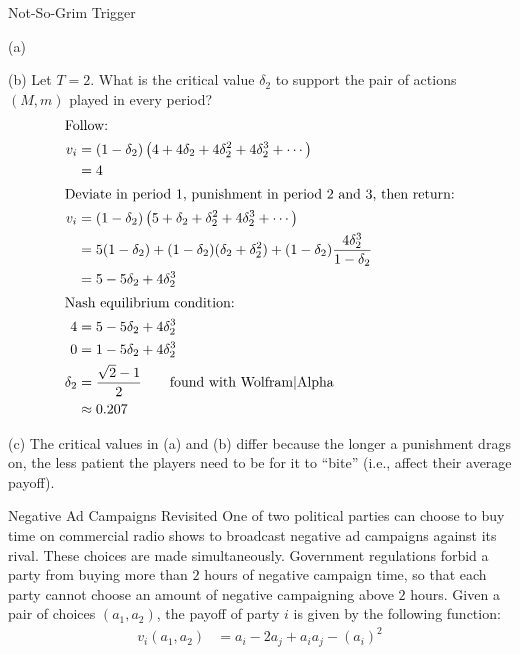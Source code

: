 \documentclass[8pt]{extarticle}
\begin{document}
\begin{problem}{Not-So-Grim Trigger}
\begin{problem}{(a)}
    \end{problem}
    \begin{problem}{(b)}
      Let $T = 2$. What is the critical value $\delta_2$ to support the pair of actions $(M,m)$ played in every period?
      \tcblower
      \begin{align*}
        \shortintertext{Follow:}
        v_i &= (1-\delta_2)\left(4 + 4\delta_2 + 4\delta_2^2 + 4\delta_2^3 + \cdots\right)\\
            &= 4\\
        \shortintertext{Deviate in period $1$, punishment in period $2$ and $3$, then return:}
        v_i &= (1-\delta_2)\left(5 + \delta_2 + \delta_2^2 + 4\delta_2^3 + \cdots\right) \\
            &= 5(1-\delta_2) + (1-\delta_2)(\delta_2 + \delta_2^2) + (1-\delta_2)\frac{4\delta_2^3}{1-\delta_2}\\
            &= 5 - 5\delta_2 + 4\delta_2^3\\
        \shortintertext{Nash equilibrium condition:}
        4 &= 5 - 5\delta_2 + 4\delta_2^3\\
        0 &= 1 - 5\delta_2 + 4\delta_2^3\\
        \delta_2 &= \frac{\sqrt{2}-1}{2} \tag*{found with Wolfram|Alpha}\\
                 &\approx 0.207
      \end{align*}
    \end{problem}
    \begin{problem}{(c)}
      The critical values in (a) and (b) differ because the longer a punishment drags on, the less patient the players need to be for it to ``bite'' (i.e., affect their average payoff).
    \end{problem}
  \end{problem}
  \begin{problem}{Negative Ad Campaigns Revisited}
    One of two political parties can choose to buy time on commercial radio shows to broadcast negative ad campaigns against its rival. These choices are made simultaneously. Government regulations forbid a party from buying more than $2$ hours of negative campaign time, so that each party cannot choose an amount of negative campaigning above $2$ hours. Given a pair of choices $(a_1,a_2)$, the payoff of party $i$ is given by the following function:
    \begin{align*}
      v_i(a_1,a_2) &= a_i - 2a_j + a_ia_j - (a_i)^2
    \end{align*}
  \end{problem}
\end{document}
